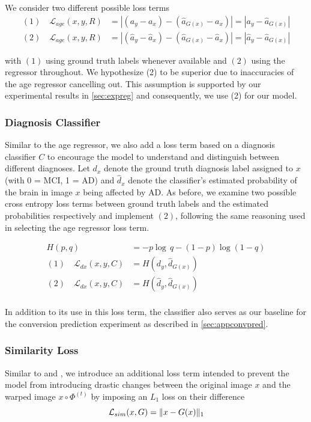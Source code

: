 We consider two different possible loss terms 
\begin{equation}
	\begin{split}
		(1) \quad \mathcal{L}_{age}(x, y, R) & = 
		| (a_y - a_x) - (\hat a_{G(x)} - a_x) | =
		| a_y - \hat a_{G(x)} | \\[8pt]
		(2) \quad \mathcal{L}_{age}(x, y, R) & =
		| (\hat a_y - \hat a_x) - (\hat a_{G(x)} - \hat a_x) | = 
		| \hat a_y - \hat a_{G(x)} |
	\end{split}
\end{equation}

with $(1)$ using ground truth labels whenever available and $(2)$ using the regressor throughout. We hypothesize (2) to be superior due to inaccuracies of the age regressor cancelling out. This assumption is supported by our experimental results in \autoref{sec:expreg} and consequently, we use (2) for our model.

\subsubsection*{Diagnosis Classifier}
Similar to the age regressor, we also add a loss term based on a diagnosis classifier $C$ to encourage the model to understand and distinguish between different diagnoses. Let $d_x$ denote the ground truth diagnosis label assigned to $x$ (with 0 = MCI, 1 = AD) and $\hat d_x$ denote the classifier's estimated probability of the brain in image $x$ being affected by AD. As before, we examine two possible cross entropy loss terms between ground truth labels and the estimated probabilities respectively and implement $(2)$, following the same reasoning used in selecting the age regressor loss term.

\begin{equation}
	\begin{split}
		H(p, q) & = -p \log\, q - (1 - p)\log(1 - q) \\[8pt]
		(1) \quad \mathcal{L}_{dx}(x, y, C) & = 
		H(d_y, \hat d_{G(x)}) \\[8pt]
		(2) \quad \mathcal{L}_{dx}(x, y, C) & =
		H(\hat d_y, \hat d_{G(x)}) \\[8pt]
	\end{split}
\end{equation}

In addition to its use in this loss term, the classifier also serves as our baseline for the conversion prediction experiment as described in \autoref{sec:appconvpred}.

\subsubsection*{Similarity Loss}
Similar to \cite{baumgartner2018visual} and \cite{wegmayr2019generative}, we introduce an additional loss term intended to prevent the model from introducing drastic changes between the original image $x$ and the warped image $ x \circ \Phi^{(t)} $ by imposing an $L_1$ loss on their difference
\begin{equation}
	\mathcal{L}_{sim}( x, G ) = \lVert x - G(x) \rVert_1
\end{equation}

